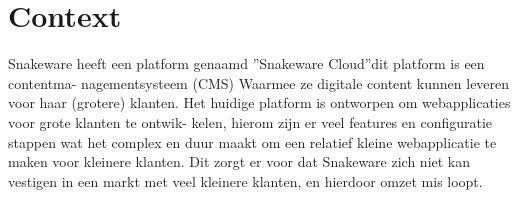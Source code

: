 \section{Context}
Snakeware heeft een platform genaamd ”Snakeware Cloud”dit platform is een contentma-
nagementsysteem (CMS) Waarmee ze digitale content kunnen leveren voor haar (grotere)
klanten. Het huidige platform is ontworpen om webapplicaties voor grote klanten te ontwik-
kelen, hierom zijn er veel features en configuratie stappen wat het complex en duur maakt
om een relatief kleine webapplicatie te maken voor kleinere klanten.
\whitespace
Dit zorgt er voor dat Snakeware zich niet kan vestigen in een markt met veel kleinere klanten, 
en hierdoor omzet mis loopt.
